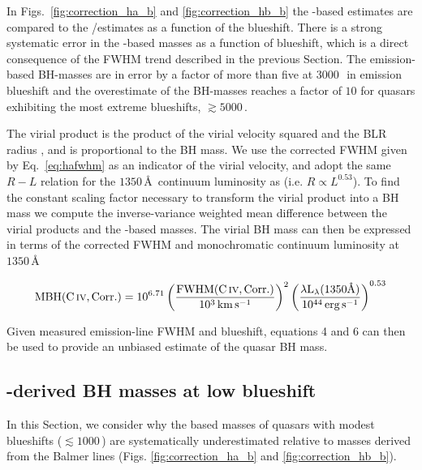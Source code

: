 In Figs.~\ref{fig:correction_ha_b} and \ref{fig:correction_hb_b} the -based estimates are compared to the \hans/\hb estimates as a function of the  blueshift. 
There is a strong systematic error in the -based masses as a function of blueshift, which is a direct consequence of the FWHM trend described in the previous Section. 
The  emission-based BH-masses are in error by a factor of more than five at $3000$\,\kms\, in  emission blueshift and the overestimate of the BH-masses reaches a factor of $10$ for quasars exhibiting the most extreme blueshifts, $\gtrsim5000$\,\kms. 

The virial product is the product of the virial velocity squared and the BLR radius \citep[e.g.][]{shen13}, and is proportional to the BH mass. 
We use the corrected  FWHM given by Eq.~\ref{eq:hafwhm} as an indicator of the virial velocity, and adopt the same $R-L$ relation for the $1350$\,\AA\, continuum luminosity as \citet{vestergaard06} (i.e. $R \propto L^{0.53}$). 
To find the constant scaling factor necessary to transform the virial product into a BH mass we compute the inverse-variance weighted mean difference between the virial products and the \hans-based masses. 
The virial BH mass can then be expressed in terms of the corrected  FWHM and monochromatic continuum luminosity at $1350$\,\AA

\begin{equation}
  \label{eq:masscorrection}
  \mathrm{MBH}(\mathrm{C}\,\textsc{iv}, \mathrm{Corr.}) = 10^{6.71}\left( \frac{ \mathrm{FWHM}(\mathrm{C}\,\textsc{iv}, \mathrm{Corr.})}{10^3 \mathrm{\,km\,s^{-1}}} \right)^2 \left( \frac{\lambda \mathrm{L}_{\lambda} (1350 \text{\AA}) }{10^{44} \mathrm{\,erg\,s^{-1}}}  \right)^{0.53}
\end{equation}

Given measured  emission-line FWHM and blueshift, equations 4 and 6 can then be used to provide an unbiased estimate of the quasar BH mass.

\subsection{-derived BH masses at low  blueshift}

In this Section, we consider why the  based masses of quasars with modest  blueshifts ($\lesssim1000$\,\kms) are systematically underestimated relative to masses derived from the Balmer lines (Figs. \ref{fig:correction_ha_b} and \ref{fig:correction_hb_b}). 

